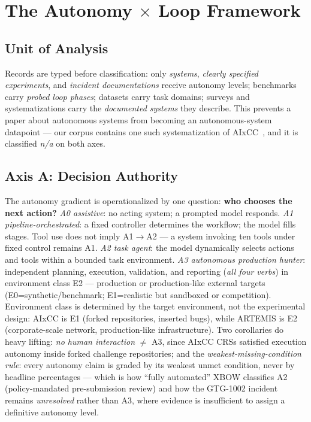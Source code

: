 \documentclass[conference,compsoc]{IEEEtran}
\begin{document}
\section{The Autonomy $\times$ Loop Framework}
\label{sec:framework}

\subsection{Unit of Analysis}
Records are typed before classification: only \emph{systems}, \emph{clearly specified
experiments}, and \emph{incident documentations} receive autonomy levels; benchmarks carry
\emph{probed loop phases}; datasets carry task domains; surveys and systematizations carry the
\emph{documented systems} they describe. This prevents a paper about autonomous systems from
becoming an autonomous-system datapoint --- our corpus contains one such systematization of
AIxCC~\cite{r7sokaixcc2026}, and it is classified \emph{n/a} on both axes.

\subsection{Axis A: Decision Authority}
The autonomy gradient is operationalized by one question: \textbf{who chooses the next action?}
\emph{A0 assistive}: no acting system; a prompted model responds. \emph{A1
pipeline-orchestrated}: a fixed controller determines the workflow; the model fills stages.
Tool use does not imply A1$\rightarrow$A2 --- a system invoking ten tools under fixed control
remains A1. \emph{A2 task agent}: the model dynamically selects actions and tools within a
bounded task environment. \emph{A3 autonomous production hunter}: independent planning,
execution, validation, and reporting (\emph{all four verbs}) in environment class E2 ---
production or production-like external targets (E0=synthetic/benchmark; E1=realistic but
sandboxed or competition). Environment class is determined by the target environment, not the
experimental design: AIxCC is E1 (forked repositories, inserted bugs), while ARTEMIS is E2
(corporate-scale network, production-like infrastructure). Two corollaries do heavy lifting:
\emph{no human interaction} $\neq$ A3, since AIxCC CRSs satisfied execution autonomy inside
forked challenge repositories; and the \emph{weakest-missing-condition rule}: every autonomy
claim is graded by its weakest unmet condition, never by headline percentages --- which is how
``fully automated'' XBOW classifies A2 (policy-mandated pre-submission review) and how the
GTG-1002 incident remains \emph{unresolved} rather than A3, where evidence is insufficient
to assign a definitive autonomy level.
\end{document}
